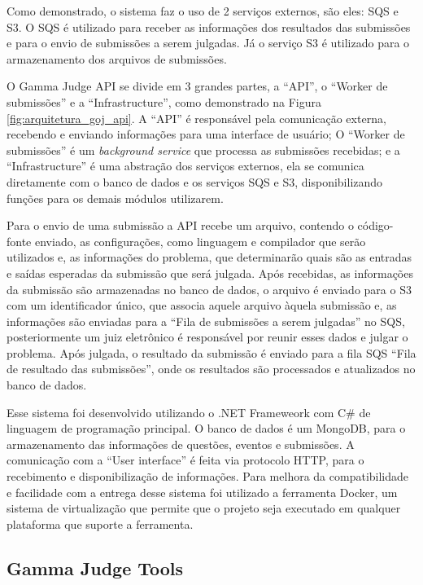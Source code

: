 Como demonstrado, o sistema faz o uso de 2 serviços externos, são eles: SQS e S3. O SQS é utilizado para receber as informações dos resultados das submissões e para o envio de submissões a serem julgadas. Já o serviço S3 é utilizado para o armazenamento dos arquivos de submissões. 

O Gamma Judge API se divide em 3 grandes partes, a ``API'', o ``Worker de submissões'' e a ``Infrastructure'', como demonstrado na Figura \ref{fig:arquitetura_goj_api}. A ``API'' é responsável pela comunicação externa, recebendo e enviando informações para uma interface de usuário; O ``Worker de submissões'' é um \textit{background service} que processa as submissões recebidas; e a ``Infrastructure'' é uma abstração dos serviços externos, ela se comunica diretamente com o banco de dados e os serviços SQS e S3, disponibilizando funções para os demais módulos utilizarem.

Para o envio de uma submissão a API recebe um arquivo, contendo o código-fonte enviado, as configurações, como linguagem e compilador que serão utilizados e, as informações do problema, que determinarão quais são as entradas e saídas esperadas da submissão que será julgada. Após recebidas, as informações da submissão são armazenadas no banco de dados, o arquivo é enviado para o S3 com um identificador único, que associa aquele arquivo àquela submissão e, as informações são enviadas para a ``Fila de submissões a serem julgadas'' no SQS, posteriormente um juiz eletrônico é responsável por reunir esses dados e julgar o problema. Após julgada, o resultado da submissão é enviado para a fila SQS ``Fila de resultado das submissões'', onde os resultados são processados e atualizados no banco de dados.

Esse sistema foi desenvolvido utilizando o .NET Frameweork com C\# de linguagem de programação principal. O banco de dados é um MongoDB, para o armazenamento das informações de questões, eventos e submissões. A comunicação com a ``User interface'' é feita via protocolo HTTP, para o recebimento e disponibilização de informações. Para melhora da compatibilidade e facilidade com a entrega desse sistema foi utilizado a ferramenta Docker, um sistema de virtualização que permite que o projeto seja executado em qualquer plataforma que suporte a ferramenta.

\subsection{Gamma Judge Tools} 
\label{subsec:arquitetura_judge_tools}

